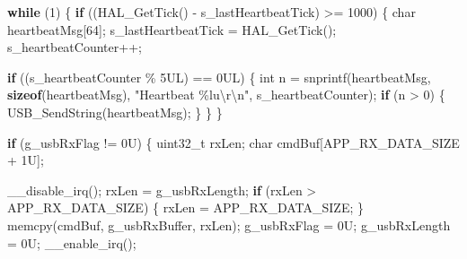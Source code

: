 \documentclass[
  chinese,
  UTF8,
  oneside,
  openany]{ctexbook}
\newenvironment{Shaded}{}{}
\newcommand{\BuiltInTok}[1]{\textcolor[rgb]{0.00,0.50,0.00}{#1}}
\newcommand{\ControlFlowTok}[1]{\textcolor[rgb]{0.00,0.44,0.13}{\textbf{#1}}}
\newcommand{\DataTypeTok}[1]{\textcolor[rgb]{0.56,0.13,0.00}{#1}}
\newcommand{\DecValTok}[1]{\textcolor[rgb]{0.25,0.63,0.44}{#1}}
\newcommand{\KeywordTok}[1]{\textcolor[rgb]{0.00,0.44,0.13}{\textbf{#1}}}
\newcommand{\NormalTok}[1]{#1}
\newcommand{\OperatorTok}[1]{\textcolor[rgb]{0.40,0.40,0.40}{#1}}
\newcommand{\SpecialCharTok}[1]{\textcolor[rgb]{0.25,0.44,0.63}{#1}}
\newcommand{\StringTok}[1]{\textcolor[rgb]{0.25,0.44,0.63}{#1}}
\begin{document}
\begin{Shaded}
\begin{Highlighting}[]
\ControlFlowTok{while} \OperatorTok{(}\DecValTok{1}\OperatorTok{)}
\OperatorTok{\{}
    \ControlFlowTok{if} \OperatorTok{((}\NormalTok{HAL\_GetTick}\OperatorTok{()} \OperatorTok{{-}}\NormalTok{ s\_lastHeartbeatTick}\OperatorTok{)} \OperatorTok{\textgreater{}=} \DecValTok{1000}\OperatorTok{)}
    \OperatorTok{\{}
        \DataTypeTok{char}\NormalTok{ heartbeatMsg}\OperatorTok{[}\DecValTok{64}\OperatorTok{];}
\NormalTok{        s\_lastHeartbeatTick }\OperatorTok{=}\NormalTok{ HAL\_GetTick}\OperatorTok{();}
\NormalTok{        s\_heartbeatCounter}\OperatorTok{++;}

        \ControlFlowTok{if} \OperatorTok{((}\NormalTok{s\_heartbeatCounter }\OperatorTok{\%} \DecValTok{5}\BuiltInTok{UL}\OperatorTok{)} \OperatorTok{==} \DecValTok{0}\BuiltInTok{UL}\OperatorTok{)}
        \OperatorTok{\{}
            \DataTypeTok{int}\NormalTok{ n }\OperatorTok{=}\NormalTok{ snprintf}\OperatorTok{(}\NormalTok{heartbeatMsg}\OperatorTok{,} \KeywordTok{sizeof}\OperatorTok{(}\NormalTok{heartbeatMsg}\OperatorTok{),}
                                             \StringTok{"Heartbeat }\SpecialCharTok{\%lu\textbackslash{}r\textbackslash{}n}\StringTok{"}\OperatorTok{,}\NormalTok{ s\_heartbeatCounter}\OperatorTok{);}
            \ControlFlowTok{if} \OperatorTok{(}\NormalTok{n }\OperatorTok{\textgreater{}} \DecValTok{0}\OperatorTok{)}
            \OperatorTok{\{}
\NormalTok{                USB\_SendString}\OperatorTok{(}\NormalTok{heartbeatMsg}\OperatorTok{);}
            \OperatorTok{\}}
        \OperatorTok{\}}
    \OperatorTok{\}}

    \ControlFlowTok{if} \OperatorTok{(}\NormalTok{g\_usbRxFlag }\OperatorTok{!=} \DecValTok{0}\BuiltInTok{U}\OperatorTok{)}
    \OperatorTok{\{}
        \DataTypeTok{uint32\_t}\NormalTok{ rxLen}\OperatorTok{;}
        \DataTypeTok{char}\NormalTok{ cmdBuf}\OperatorTok{[}\NormalTok{APP\_RX\_DATA\_SIZE }\OperatorTok{+} \DecValTok{1}\BuiltInTok{U}\OperatorTok{];}

\NormalTok{        \_\_disable\_irq}\OperatorTok{();}
\NormalTok{        rxLen }\OperatorTok{=}\NormalTok{ g\_usbRxLength}\OperatorTok{;}
        \ControlFlowTok{if} \OperatorTok{(}\NormalTok{rxLen }\OperatorTok{\textgreater{}}\NormalTok{ APP\_RX\_DATA\_SIZE}\OperatorTok{)}
        \OperatorTok{\{}
\NormalTok{            rxLen }\OperatorTok{=}\NormalTok{ APP\_RX\_DATA\_SIZE}\OperatorTok{;}
        \OperatorTok{\}}
\NormalTok{        memcpy}\OperatorTok{(}\NormalTok{cmdBuf}\OperatorTok{,}\NormalTok{ g\_usbRxBuffer}\OperatorTok{,}\NormalTok{ rxLen}\OperatorTok{);}
\NormalTok{        g\_usbRxFlag }\OperatorTok{=} \DecValTok{0}\BuiltInTok{U}\OperatorTok{;}
\NormalTok{        g\_usbRxLength }\OperatorTok{=} \DecValTok{0}\BuiltInTok{U}\OperatorTok{;}
\NormalTok{        \_\_enable\_irq}\OperatorTok{();}


\end{Highlighting}
\end{Shaded}
\end{document}
